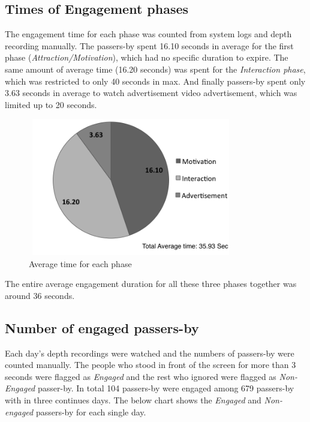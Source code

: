 \subsection{Times of Engagement phases}
The engagement time for each phase was counted from system logs and depth recording manually. The passers-by spent 16.10 seconds in average for the first phase (\emph{Attraction/Motivation}), which had no specific duration to expire.  The same amount of average time (16.20 seconds) was spent for the \emph{Interaction phase}, which was restricted to only 40 seconds in max. And finally passers-by spent only 3.63 seconds in average to watch advertisement video advertisement, which was limited up to 20 seconds.

\begin{figure}[H]
    \centering
    \includegraphics[width=90mm,height=60mm]{Figures/9/avg_phases}
    \caption{Average time for each phase}%
    \label{fig:newbodyaveragephases}%
\end{figure}

The entire average engagement duration for all these three phases together was around 36 seconds.


\subsection{Number of engaged passers-by}
Each day’s depth recordings were watched and the numbers of passers-by were counted manually. The people who stood in front of the screen for more than 3 seconds were flagged as \emph{Engaged} and the rest who ignored were flagged as \emph{Non-Engaged} passer-by. In total 104 passers-by were engaged among 679 passers-by with in three continues days. The below chart shows the \emph{Engaged} and \emph{Non-engaged} passers-by for each single day.

